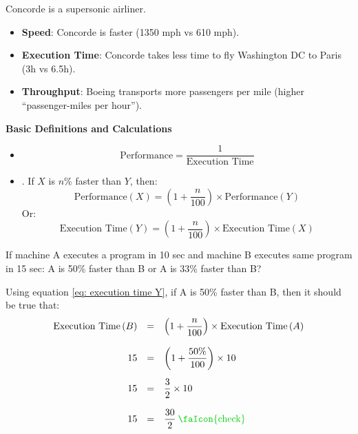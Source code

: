 \begin{examplebox}
  Concorde is a supersonic airliner.
  \begin{itemize}
    \item \textbf{Speed}: Concorde is faster (1350 mph vs 610 mph).
    \item \textbf{Execution Time}: Concorde takes less time to fly Washington DC to Paris (3h vs 6.5h).
    \item \textbf{Throughput}: Boeing transports more passengers per mile (higher ``passenger-miles per hour'').
  \end{itemize}
\end{examplebox}

\newpage

\begin{flushleft}
  \textcolor{Green3}{ \textbf{Basic Definitions and Calculations}}
\end{flushleft}
\begin{itemize}
  \item {}
  \begin{equation}\label{eq: performance}
    \text{Performance} = \dfrac{1}{\text{Execution Time}}
  \end{equation}

  \item {}. If $X$ is $n$\% faster than $Y$, then:
  \begin{equation}\label{eq: performance X}
    \text{Performance}\left(X\right) = \left(
      1 + \dfrac{n}{100}
    \right) \times \text{Performance}\left(Y\right)
  \end{equation}
  Or:
  \begin{equation}\label{eq: execution time Y}
    \text{Execution Time}\left(Y\right) = \left(
      1 + \dfrac{n}{100}
    \right) \times \text{Execution Time}\left(X\right)
  \end{equation}
\end{itemize}

\begin{examplebox}
  If machine A executes a program in 10 sec and machine B executes same program in 15 sec: A is 50\% faster than B or A is 33\% faster than B?

  Using equation \ref{eq: execution time Y}, if A is 50\% faster than B, then it should be true that:
  \begin{equation*}
    \begin{array}{rcl}
      \text{Execution Time}\left(B\right) &=& \left(
        1 + \dfrac{n}{100}
      \right) \times \text{Execution Time}\left(A\right) \\ [1.5em]
      15 &=& \left(
        1 + \dfrac{50\%}{100}
      \right) \times 10 \\ [1.5em]
      15 &=& \dfrac{3}{2} \times 10 \\ [1.5em]
      15 &=& \dfrac{30}{2} \: \text{\textcolor{Green3}{\faIcon{check}}}
    \end{array}
  \end{equation*}
\end{examplebox}

